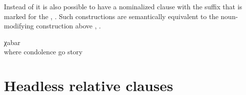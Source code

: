 Instead of  it is also possible to have a nominalized clause with the  suffix that is marked for the  , . Such constructions are semantically equivalent to the noun-modifying construction above , . 
%
\begin{exe}
	\ex	\label{ex:the story how we went somewhere for condolence}
		χabar\\
		where	condolence	go	story\\
	\glt	{}
\end{exe}



\section{Headless relative clauses}
\label{sec:Headless relative clauses}


